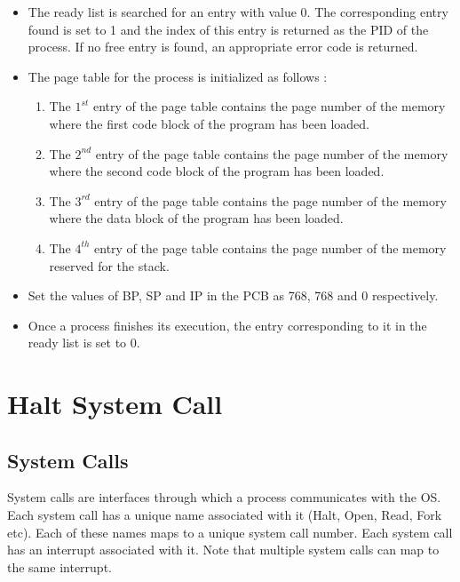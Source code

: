 \documentclass[11pt]{report}
\begin{document}
\begin{itemize}
	\item The ready list is searched for an entry with value 0. The corresponding entry found is set to 1 and the index of this entry is returned as the PID of the process. If no free entry is found, an appropriate error code is returned.
	\item The page table for the process is initialized as follows :
	\begin{enumerate}
		\item The $1^{st}$ entry of the page table contains the page number of the memory where the first code block of the program has been loaded.
		\item The $2^{nd}$ entry of the page table contains the page number of the memory where the second code block of the program has been loaded.
		\item The $3^{rd}$ entry of the page table contains the page number of the memory where the data block of the program has been loaded.
		\item The $4^{th}$ entry of the page table contains the page number of the memory reserved for the stack.
	\end{enumerate}
	\item Set the values of BP, SP and IP in the PCB as 768, 768 and 0 respectively.
	\item Once a process finishes its execution, the entry corresponding to it in the ready list is set to 0.
\end{itemize}







\chapter{Halt System Call}
\label{chp:halt_system_calls}

\section{System Calls}
System calls are interfaces through which a process communicates with the OS. Each system call has a unique name associated with it (Halt, Open, Read, Fork etc). Each of these names maps to a unique system call number. Each system call has an interrupt associated with it. Note that multiple system calls can map to the same interrupt.
\end{document}
